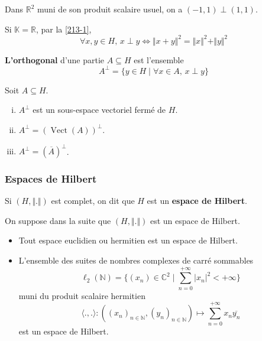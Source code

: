 	\begin{example}
		Dans $\mathbb{R}^2$ muni de son produit scalaire usuel, on a $(-1,1) \perp (1,1)$.
	\end{example}
	
	\begin{remark}
		Si $\mathbb{K} = \mathbb{R}$, par la \cref{213-1},
		\[ \forall x, y \in H, \, x \perp y \iff \Vert x + y \Vert^2 = \Vert x \Vert^2 + \Vert y \Vert^2 \]
	\end{remark}
	
	\begin{definition}
		\textbf{L'orthogonal} d'une partie $A \subseteq H$ est l'ensemble
		\[ A^\perp = \{ y \in H \mid \forall x \in A, \, x \perp y \} \]
	\end{definition}
	
	
	\begin{proposition}
		Soit $A \subseteq H$.
		\begin{enumerate}[(i)]
			\item $A^\perp$ est un sous-espace vectoriel fermé de $H$.
			\item $A^\perp = (\operatorname{Vect}(A))^\perp$.
			\item $A^\perp = (\overline{A})^\perp$.
		\end{enumerate}
	\end{proposition}
	
	\newpage
	
	\subsubsection{Espaces de Hilbert}
	
	
	\begin{definition}
		Si $(H, \Vert . \Vert)$ est complet, on dit que $H$ est un \textbf{espace de Hilbert}.
	\end{definition}
	
	On suppose dans la suite que $(H, \Vert . \Vert)$ est un espace de Hilbert.
	
	\begin{example}
		\begin{itemize}
			\item Tout espace euclidien ou hermitien est un espace de Hilbert.
			\item L'ensemble des suites de nombres complexes de carré sommables
			\[ \ell_2(\mathbb{N}) = \{ (x_n) \in \mathbb{C}^2 \mid \sum_{n=0}^{+\infty} \vert x_n \vert^2 < +\infty \} \]
			muni du produit scalaire hermitien
			\[ \langle ., . \rangle : ((x_n)_{n \in \mathbb{N}},(y_n)_{n \in \mathbb{N}}) \mapsto \sum_{n=0}^{+\infty} x_n \overline{y_n} \]
			est un espace de Hilbert.
		\end{itemize}
	\end{example}
	

